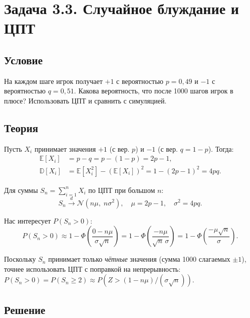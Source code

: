 \documentclass[a4paper,14pt]{article}
\begin{document}
\newpage
\section{Задача 3.3. Случайное блуждание и ЦПТ}

\subsection*{Условие}

На каждом шаге игрок получает $+1$ с вероятностью $p = 0{,}49$ и $-1$ с вероятностью $q = 0{,}51$.
Какова вероятность, что после 1000 шагов игрок в плюсе?
Использовать ЦПТ и сравнить с симуляцией.

\subsection*{Теория}

Пусть $X_i$ принимает значения $+1$ (с вер. $p$) и $-1$ (с вер. $q = 1-p$). Тогда:
\begin{align}
    \mathbb{E}[X_i] &= p - q = p - (1-p) = 2p - 1, \label{eq:ex}\\
    \mathbb{D}[X_i] &= \mathbb{E}[X_i^2] - (\mathbb{E}[X_i])^2 = 1 - (2p-1)^2 = 4pq. \label{eq:varx}
\end{align}

Для суммы $S_n = \sum_{i=1}^n X_i$ по ЦПТ при большом $n$:
\begin{equation}
    S_n \xrightarrow{d} \mathcal{N}(n\mu,\; n\sigma^2),
    \quad \mu = 2p-1,\quad \sigma^2 = 4pq.
    \label{eq:clt3}
\end{equation}

Нас интересует $P(S_n > 0)$:
\begin{equation}
    P(S_n > 0) \approx 1 - \Phi\!\left(\frac{0 - n\mu}{\sigma\sqrt{n}}\right)
    = 1 - \Phi\!\left(\frac{-n\mu}{\sqrt{n}\,\sigma}\right)
    = 1 - \Phi\!\left(\frac{-\mu\sqrt{n}}{\sigma}\right).
    \label{eq:p_clt3}
\end{equation}

Поскольку $S_n$ принимает только \emph{чётные} значения (сумма 1000 слагаемых $\pm 1$), точнее использовать ЦПТ с поправкой на непрерывность: $P(S_n > 0) = P(S_n \geq 2) \approx P(Z > (1 - n\mu)/(\sigma\sqrt{n}))$.

\subsection*{Решение}
\end{document}
